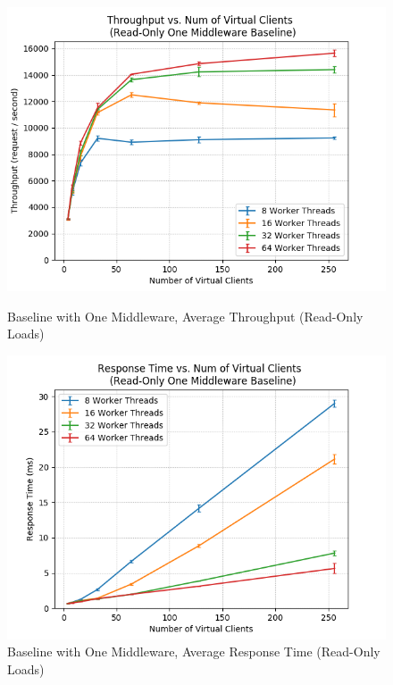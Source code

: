 \documentclass[11pt,a4paper]{article}
\begin{document}
\begin{figure}[H]
	\captionsetup{font=scriptsize,labelfont=scriptsize,justification=centering}
	\centering
	\begin{minipage}{0.5\textwidth}
		\centering
		\includegraphics[scale=0.525]{images/3a_one-mw_r-o_tps.png}
		\caption{Baseline with One Middleware, Average Throughput (Read-Only Loads)}
	\end{minipage}\hfill
	\begin{minipage}{0.5\textwidth}
		\centering
		\includegraphics[scale=0.525]{images/3a_one-mw_r-o_rt.png}
		\caption{{Baseline with One Middleware, Average Response Time (Read-Only Loads)}}
	\end{minipage}
\end{figure}
\end{document}
